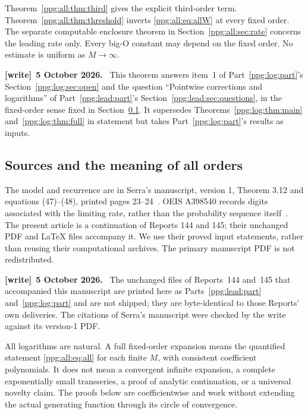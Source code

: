 \documentclass[11pt,letterpaper]{article}
\theoremstyle{remark}\newtheorem{remark}[theorem]{Remark}
\numberwithin{equation}{section}
\newenvironment{writenote}[1][]{\par\smallskip\begingroup\small
 \noindent\textbf{[write]}\if\relax\detokenize{#1}\relax\else~\textbf{#1.}\fi\ }%
 {\par\endgroup\smallskip}
\begin{document}
Theorem~\ref{ppg:all:thm:third} gives the explicit third-order term. Theorem~\ref{ppg:all:thm:threshold} inverts \eqref{ppg:all:eq:allW} at every fixed order. The separate computable enclosure theorem in Section~\ref{ppg:all:sec:rate} concerns the leading rate only. Every big-O constant may depend on the fixed order. No estimate is uniform as $M\to\infty$.
\begin{writenote}[5 October 2026]
This theorem answers item~1 of Part~\ref{ppg:log:part}'s Section~\ref{ppg:log:sec:open} and the question ``Pointwise corrections and logarithms'' of Part~\ref{ppg:lead:part}'s Section~\ref{ppg:lead:sec:questions}, in the fixed-order sense fixed in Section~\ref{ppg:all:sub:scope}. It supersedes Theorems~\ref{ppg:log:thm:main} and~\ref{ppg:log:thm:full} in statement but takes Part~\ref{ppg:log:part}'s results as inputs.
\end{writenote}

\subsection{Sources and the meaning of all orders}\label{ppg:all:sub:scope}
The model and recurrence are in Serra's manuscript, version 1, Theorem 3.12 and equations (47)--(48), printed pages 23--24~\cite{serra}. OEIS A398540 records digits associated with the limiting rate, rather than the probability sequence itself~\cite{oeis}. The present article is a continuation of Reports 144 and 145; their unchanged PDF and LaTeX files accompany it. We use their proved input statements, rather than reusing their computational archives. The primary manuscript PDF is not redistributed.
\begin{writenote}[5 October 2026]
The unchanged files of Reports~144 and~145 that accompanied this manuscript are printed here as Parts~\ref{ppg:lead:part} and~\ref{ppg:log:part} and are not shipped; they are byte-identical to those Reports' own deliveries. The citations of Serra's manuscript were checked by the write against its version-1 PDF.
\end{writenote}

All logarithms are natural. A full fixed-order expansion means the quantified statement \eqref{ppg:all:eq:all} for each finite $M$, with consistent coefficient polynomials. It does not mean a convergent infinite expansion, a complete exponentially small transseries, a proof of analytic continuation, or a universal novelty claim. The proofs below are coefficientwise and work without extending the actual generating function through its circle of convergence.
\end{document}
